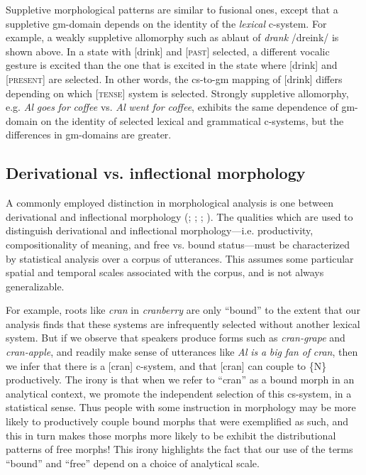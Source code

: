   Suppletive morphological patterns are similar to fusional ones, except that a suppletive gm-domain depends on the identity of the \textit{lexical} c-system. For example, a weakly suppletive allomorphy such as ablaut of \textit{drank} /dreink/ is shown above. In a state with [drink] and [\textsc{past}] selected, a different vocalic gesture is excited than the one that is excited in the state where [drink] and [\textsc{present}] are selected. In other words, the cs-to-gm mapping of [drink] differs depending on which [\textsc{tense}] system is selected. Strongly suppletive allomorphy, e.g. \textit{Al} \textit{goes} \textit{for} \textit{coffee} vs. \textit{Al} \textit{went} \textit{for} \textit{coffee}, exhibits the same dependence of gm-domain on the identity of selected lexical and grammatical c-systems, but the differences in gm-domains are greater.

\subsection{Derivational vs. inflectional morphology}

A commonly employed distinction in morphological analysis is one between derivational and inflectional morphology (\citealt{BickelNichols2007}; \citealt{Booij1996}; \citealt{Dressler1989}; \citealt{HaspelmathSims2013}). The qualities which are used to distinguish derivational and inflectional morphology—i.e. productivity, compositionality of meaning, and free vs. bound status—must be characterized by statistical analysis over a corpus of utterances. This assumes some particular spatial and temporal scales associated with the corpus, and is not always generalizable. 

  For example, roots like \textit{cran} in \textit{cranberry} are only “bound” to the extent that our analysis finds that these systems are infrequently selected without another lexical system. But if we observe that speakers produce forms such as \textit{cran-grape} and \textit{cran-apple}, and readily make sense of utterances like \textit{Al} \textit{is} \textit{a} \textit{big} \textit{fan} \textit{of} \textit{cran}, then we infer that there is a [cran] c-system, and that [cran] can couple to \{N\} productively. The irony is that when we refer to “cran” as a bound morph in an analytical context, we promote the independent selection of this cs-system, in a statistical sense. Thus people with some instruction in morphology may be more likely to productively couple bound morphs that were exemplified as such, and this in turn makes those morphs more likely to be exhibit the distributional patterns of free morphs! This irony highlights the fact that our use of the terms “bound” and “free” depend on a choice of analytical scale.

